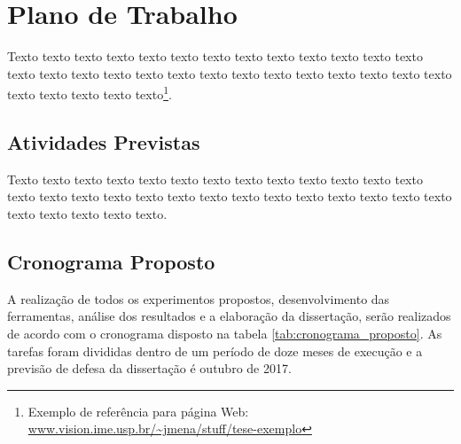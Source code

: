 \chapter{Plano de Trabalho}
\label{cap:conclusoes}

Texto texto texto texto texto texto texto texto texto texto texto texto texto
texto texto texto texto texto texto texto texto texto texto texto texto texto
texto texto texto texto texto texto\footnote{Exemplo de referência para página
Web: \url{www.vision.ime.usp.br/~jmena/stuff/tese-exemplo}}.

\section{Atividades Previstas}

Texto texto texto texto texto texto texto texto texto texto texto texto texto
texto texto texto texto texto texto texto texto texto texto texto texto texto
texto texto texto texto texto texto. 


\section{Cronograma Proposto}
A realização de todos os experimentos propostos, desenvolvimento das ferramentas, análise dos resultados e a elaboração da dissertação, serão realizados de acordo com o cronograma disposto na tabela \ref{tab:cronograma_proposto}. As tarefas foram divididas dentro de um período de doze meses de execução e a previsão de defesa da dissertação é outubro de 2017.

